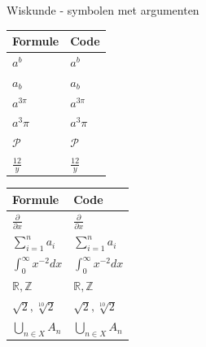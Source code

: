 \def\extraslistsep{\hspace{0.5em}\textcolor{red!80!black}{\vrule width 1pt height 0.6\baselineskip\relax}\hspace{0.5em}}
\def\es#1{\adjustbox{scale=0.8}{#1}}

\begin{frame}[fragile]{Wiskunde - symbolen met argumenten}
	\renewcommand{\arraystretch}{1.5}%
	\begin{tabularx}{0.4\textwidth}{ll}
		\toprule
		Formule & Code\\
		\midrule
		$ a^b $ & \texttt{$ a^b $}\\
		$ a_b $ & \texttt{$ a_b $} \\
		$ a^{3 \pi} $ & \texttt{$ a^{3 \pi} $} \\
		$ a^3 \pi $ & \texttt{$ a^3 \pi $} \\
		$ \mathcal{P} $ & \texttt{$ \mathcal{P} $} \\
		$ \frac{12}{y} $  & \texttt{$\frac{12}{y}$}\\
		\bottomrule
	\end{tabularx}%
	\begin{tabularx}{0.6\textwidth}{ll}
		\toprule
		Formule & Code\\
		\midrule
		$ \frac{\partial}{\partial x} $ & \texttt{$ \frac{\partial}{\partial x} $} \\
		$ \sum_{i=1}^{n}a_i $ & \texttt{$ \sum_{i=1}^{n}a_i $}\\
		$ \int_{0}^{\infty} x^{-2} dx $  & \texttt{$ \int_{0}^{\infty} x^{-2} dx $}\\
		$ \mathbb{R}, \mathbb{Z} $ & \texttt{$ \mathbb{R}, \mathbb{Z} $} \\
		$ \sqrt{2}, \sqrt[10]{2} $  & \texttt{$ \sqrt{2}, \sqrt[10]{2} $} \\
		$ \bigcup_{n \in X} A_n $ & \texttt{$ \bigcup_{n \in X} A_n $} \\
		\bottomrule
	\end{tabularx}%
	\par{}
\end{frame}